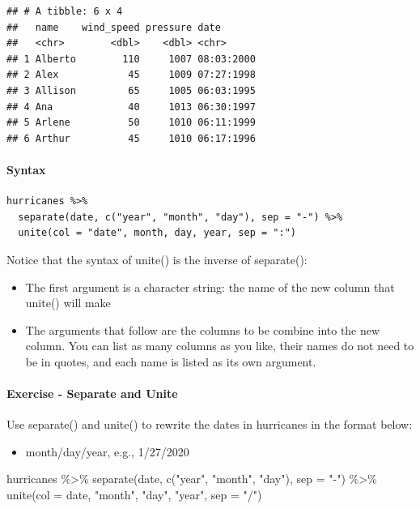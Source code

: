 \documentclass[
]{article}
\newenvironment{Shaded}{\begin{snugshade}}{\end{snugshade}}
\newcommand{\AttributeTok}[1]{\textcolor[rgb]{0.77,0.63,0.00}{#1}}
\newcommand{\FunctionTok}[1]{\textcolor[rgb]{0.00,0.00,0.00}{#1}}
\newcommand{\NormalTok}[1]{#1}
\newcommand{\SpecialCharTok}[1]{\textcolor[rgb]{0.00,0.00,0.00}{#1}}
\newcommand{\StringTok}[1]{\textcolor[rgb]{0.31,0.60,0.02}{#1}}
\providecommand{\tightlist}{%
  \setlength{\itemsep}{0pt}\setlength{\parskip}{0pt}}
\begin{document}
\begin{verbatim}
## # A tibble: 6 x 4
##   name    wind_speed pressure date      
##   <chr>        <dbl>    <dbl> <chr>     
## 1 Alberto        110     1007 08:03:2000
## 2 Alex            45     1009 07:27:1998
## 3 Allison         65     1005 06:03:1995
## 4 Ana             40     1013 06:30:1997
## 5 Arlene          50     1010 06:11:1999
## 6 Arthur          45     1010 06:17:1996
\end{verbatim}

\hypertarget{syntax-2}{%
\paragraph{Syntax}\label{syntax-2}}

\begin{verbatim}
hurricanes %>%
  separate(date, c("year", "month", "day"), sep = "-") %>%
  unite(col = "date", month, day, year, sep = ":")
\end{verbatim}

Notice that the syntax of unite() is the inverse of separate():

\begin{itemize}
\tightlist
\item
  The first argument is a character string: the name of the new column
  that unite() will make
\item
  The arguments that follow are the columns to be combine into the new
  column. You can list as many columns as you like, their names do not
  need to be in quotes, and each name is listed as its own argument.
\end{itemize}

\hypertarget{exercise---separate-and-unite}{%
\paragraph{Exercise - Separate and
Unite}\label{exercise---separate-and-unite}}

Use separate() and unite() to rewrite the dates in hurricanes in the
format below:

\begin{itemize}
\tightlist
\item
  month/day/year, e.g., 1/27/2020
\end{itemize}

\begin{Shaded}
\begin{Highlighting}[]
\NormalTok{hurricanes }\SpecialCharTok{\%\textgreater{}\%} \FunctionTok{separate}\NormalTok{(date, }\FunctionTok{c}\NormalTok{(}\StringTok{"year"}\NormalTok{, }\StringTok{"month"}\NormalTok{, }\StringTok{"day"}\NormalTok{), }\AttributeTok{sep =} \StringTok{"{-}"}\NormalTok{) }\SpecialCharTok{\%\textgreater{}\%}
  \FunctionTok{unite}\NormalTok{(}\AttributeTok{col =}\NormalTok{ date, }\StringTok{"month"}\NormalTok{, }\StringTok{"day"}\NormalTok{, }\StringTok{"year"}\NormalTok{, }\AttributeTok{sep =} \StringTok{"/"}\NormalTok{)}
\end{Highlighting}
\end{Shaded}
\end{document}
